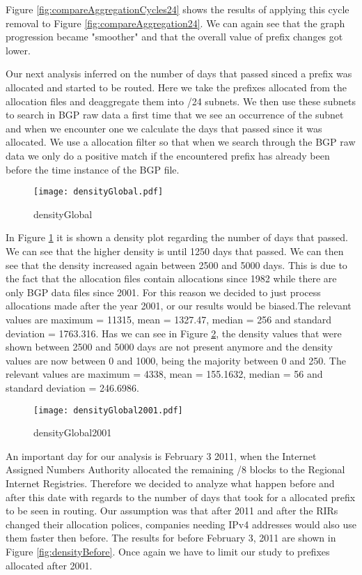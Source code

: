 \documentclass[11pt,a4paper]{scrreprt}
\begin{document}
Figure \ref{fig:compareAggregationCycles24} shows the results of applying this cycle removal to Figure \ref{fig:compareAggregation24}. We can again see that the graph progression became "smoother" and that the overall value of prefix changes got lower. 

Our next analysis inferred on the number of days that passed sinced a prefix was allocated and started to be routed. Here we take the prefixes allocated from the allocation files and deaggregate them into /24 subnets. We then use these subnets to search in BGP raw data a first time that we see an occurrence of the subnet and when we encounter one we calculate the days that passed since it was allocated. We use a allocation filter so that when we search through the BGP raw data we only do a positive match if the encountered prefix has already been before the time instance of the BGP file.  

\begin{figure}[ht!]
\centering
\texttt{[image: densityGlobal.pdf]}
\caption{densityGlobal}
\label{fig:densityGlobal}
\end{figure}

In Figure \ref{fig:densityGlobal} it is shown a density plot regarding the number of days that passed. We can see that the higher density is until 1250 days that passed. We can then see that the density increased again between 2500 and 5000 days. This is due to the fact that the allocation files contain allocations since 1982 while there are only BGP data files since 2001. For this reason we decided to just process allocations made after the year 2001, or our results would be biased.The relevant values are maximum = 11315, mean = 1327.47, median = 256 and standard deviation = 1763.316. 
Has we can see in Figure \ref{fig:densityGlobal2001}, the density values that were shown between 2500
and 5000 days  are not present anymore and the density values are now between 0 and 1000, being the majority between 0 and 250. The relevant values are maximum = 4338, mean = 155.1632, median = 56 and standard deviation = 246.6986.

\begin{figure}[ht!]
\centering
\texttt{[image: densityGlobal2001.pdf]}
\caption{densityGlobal2001}
\label{fig:densityGlobal2001}
\end{figure}

An important day for our analysis is February 3 2011, when the Internet Assigned Numbers Authority allocated the remaining /8 blocks to the Regional Internet Registries. Therefore we decided to analyze what happen before and after this date with regards to the number of days that took for a allocated prefix to be seen in routing. Our assumption was that after 2011 and after the RIRs changed their allocation polices, companies needing IPv4 addresses would also use them faster then before. 
The results for before February 3, 2011 are shown in Figure \ref{fig:densityBefore}. Once again we have to limit our study to prefixes allocated after 2001.  
\end{document}
